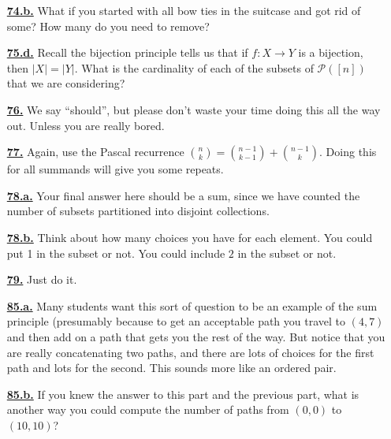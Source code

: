 \documentclass[10pt,]{book}
\theoremstyle{plain}
\theoremstyle{definition}
\theoremstyle{definition}
\theoremstyle{definition}
\numberwithin{equation}{chapter}
\def\pow{\mathcal P}
\newcommand{\card}[1]{\left| #1 \right|}
\begin{document}
\begin{itemize}[itemsep=1em]
\hypertarget{a-74.b}{}\item[\textbf{\hyperref[task-105]{74.b.}}]
\hypertarget{p-564}{}%
What if you started with all bow ties in the suitcase and got rid of some?  How many do you need to remove?%

\hypertarget{a-75.d}{}\item[\textbf{\hyperref[task-110]{75.d.}}]
\hypertarget{p-572}{}%
Recall the bijection principle tells us that if \(f:X \to Y\) is a bijection, then \(\card{X} = \card{Y}\).  What is the cardinality of each of the subsets of \(\pow([n])\) that we are considering?%

\hypertarget{a-76}{}\item[\textbf{\hyperref[act-pascalrowsum-alg]{76.}}]
\hypertarget{p-578}{}%
We say ``should'', but please don't waste your time doing this all the way out.  Unless you are really bored.%

\hypertarget{a-77}{}\item[\textbf{\hyperref[activity-70]{77.}}]
\hypertarget{p-580}{}%
Again, use the Pascal recurrence \(\binom{n}{k} = \binom{n-1}{k-1} + \binom{n-1}{k}\).  Doing this for all summands will give you some repeats.%

\hypertarget{a-78.a}{}\item[\textbf{\hyperref[task-111]{78.a.}}]
\hypertarget{p-584}{}%
Your final answer here should be a sum, since we have counted the number of subsets partitioned into disjoint collections.%

\hypertarget{a-78.b}{}\item[\textbf{\hyperref[task-112]{78.b.}}]
\hypertarget{p-586}{}%
Think about how many choices you have for each element.  You could put 1 in the subset or not.  You could include \(2\) in the subset or not.%

\hypertarget{a-79}{}\item[\textbf{\hyperref[act-pascalrowsum-binom]{79.}}]
\hypertarget{p-591}{}%
Just do it.%

\hypertarget{a-85.a}{}\item[\textbf{\hyperref[task-129]{85.a.}}]
\hypertarget{p-629}{}%
Many students want this sort of question to be an example of the sum principle (presumably because to get an acceptable path you travel to \((4,7)\) and then add on a path that gets you the rest of the way.  But notice that you are really concatenating two paths, and there are lots of choices for the first path and lots for the second.  This sounds more like an ordered pair.%

\hypertarget{a-85.b}{}\item[\textbf{\hyperref[task-130]{85.b.}}]
\hypertarget{p-631}{}%
If you knew the answer to this part and the previous part, what is another way you could compute the number of paths from \((0,0)\) to \((10,10)\)?%


\end{itemize}
\end{document}

